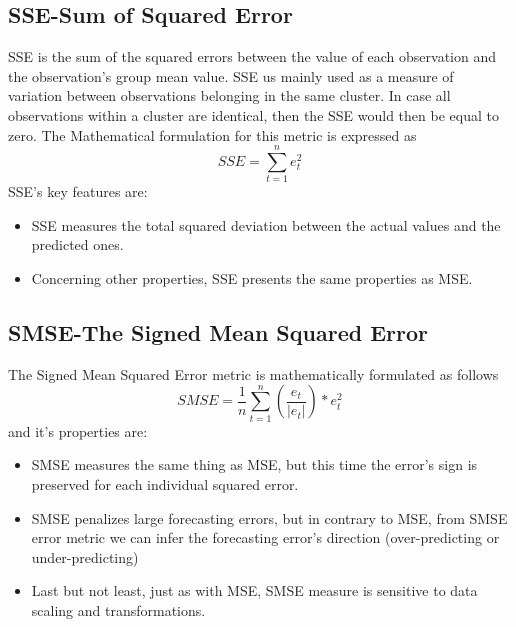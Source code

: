 \subsection{SSE-Sum of Squared Error}
SSE is the sum of the squared errors between the value of each observation and the observation's group mean value. SSE us mainly used as a measure of variation between observations belonging in the same cluster. In case all observations within a cluster are identical, then the SSE would then be equal to zero. The Mathematical formulation for this metric is expressed as $$SSE=\sum_{t=1}^{n}{e_{t}^2}$$  
SSE's key features are: 
\begin{itemize}
    \item SSE measures the total squared deviation between the actual values and the predicted ones.
    \item Concerning other properties, SSE presents the same properties as MSE. 
\end{itemize} 
\subsection{SMSE-The Signed Mean Squared Error}
The Signed Mean Squared Error metric is mathematically formulated as follows $$SMSE=\frac{1}{n}\sum_{t=1}^{n}{(\frac{e_{t}}{|e_{t}|})*e_{t}^{2}}$$
 and it's properties are: 
\begin{itemize}
    \item SMSE measures the same thing as MSE, but this time the error's sign  is preserved for each individual squared error. 
    \item SMSE penalizes large forecasting errors, but in contrary to MSE, from SMSE error metric we can infer the forecasting error's direction (over-predicting or under-predicting) 
    \item Last but not least, just as with MSE, SMSE measure is sensitive to data scaling and transformations.
\end{itemize} 
